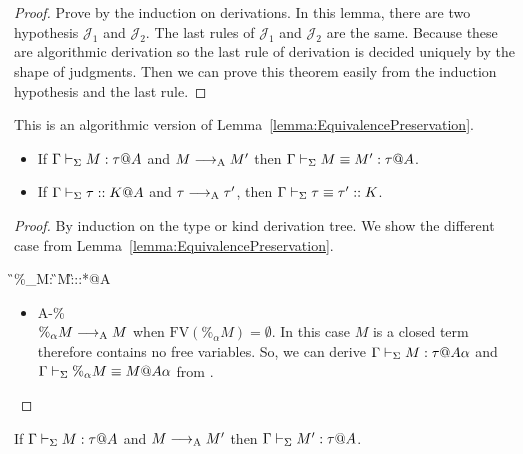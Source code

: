 \begin{proof}
    Prove by the induction on derivations.  In this lemma, there are two
    hypothesis \( \mathcal{J}_1 \) and \( \mathcal{J}_2 \).  The last rules of
    \( \mathcal{J}_1 \) and \( \mathcal{J}_2 \) are the same.  Because these
    are algorithmic derivation so the last rule of derivation is decided
    uniquely by the shape of judgments.  Then we can prove this theorem easily
    from the induction hypothesis and the last rule.
\end{proof}



\begin{lemma}
    \label{lemma:EquivalencePreservationOfAlgorithmicReduction}
    This is an algorithmic version of Lemma~\ref{lemma:EquivalencePreservation}.
    \begin{itemize}
        \item If \( \Gamma \vdash_\Sigma M : \tau @ A \) and \( M \longrightarrow_{\text{A}} M' \) then \( \Gamma \vdash_\Sigma M \equiv M' : \tau @ A \).
        \item If \( \Gamma \vdash_\Sigma \tau :: K @ A \) and \( \tau \longrightarrow_{\text{A}} \tau' \), then \( \Gamma \vdash_\Sigma \tau \equiv \tau' :: K \).
    \end{itemize}
\end{lemma}
\begin{proof}
    By induction on the type or kind derivation tree. We show the different case from Lemma~\ref{lemma:EquivalencePreservation}.

    \begin{rneqncase}{\TCsp}{
            \G\V \%_\alpha M: 
            \G\V M:\tau@A {}\G\V \tau::*@{A\alpha}
        }
        \begin{itemize}
                \item \textsc{A-\%} \\
                    \( \%_\alpha M \longrightarrow_{\text{A}} M \) when \( \text{FV}(\%_\alpha M) =
                    \emptyset \). In this case \( M \) is a closed term
                    therefore contains no free variables. So, we can derive \(
                    \Gamma \vdash_\Sigma M : \tau @ A\alpha \) and \( \Gamma \vdash_\Sigma \%_\alpha M \equiv M @
                    A\alpha \) from \QPercent.
        \end{itemize}
    \end{rneqncase}
\end{proof}

\begin{lemma}
    \label{lemma:TypePreservationofAlgorithmicReduction}
    If \( \Gamma \vdash_\Sigma M:\tau @A \) and \( M \longrightarrow_{\text{A}} M' \) then \( \Gamma \vdash_\Sigma M' : \tau @ A \).
\end{lemma}

